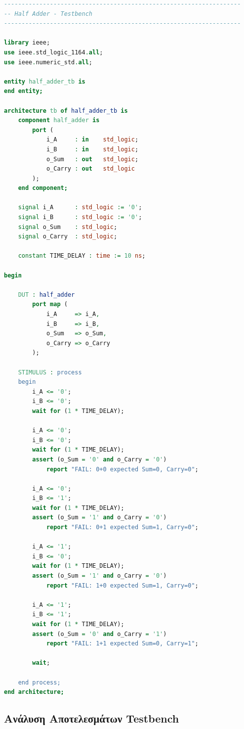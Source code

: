 \documentclass[12pt]{article}
\begin{document}
\begin{lstlisting}[language=VHDL]
-------------------------------------------------------------------
-- Half Adder - Testbench
-------------------------------------------------------------------

library ieee;
use ieee.std_logic_1164.all;
use ieee.numeric_std.all;

entity half_adder_tb is
end entity;

architecture tb of half_adder_tb is
    component half_adder is
        port (
            i_A     : in    std_logic;
            i_B     : in    std_logic;
            o_Sum   : out   std_logic;
            o_Carry : out   std_logic
        );
    end component;

    signal i_A      : std_logic := '0';
    signal i_B      : std_logic := '0';
    signal o_Sum    : std_logic;
    signal o_Carry  : std_logic;

    constant TIME_DELAY : time := 10 ns;

begin

    DUT : half_adder
        port map (
            i_A     => i_A,
            i_B     => i_B,
            o_Sum   => o_Sum,
            o_Carry => o_Carry
        );

    STIMULUS : process
    begin
        i_A <= '0';
        i_B <= '0';
        wait for (1 * TIME_DELAY);

        i_A <= '0';
        i_B <= '0';
        wait for (1 * TIME_DELAY);
        assert (o_Sum = '0' and o_Carry = '0')
            report "FAIL: 0+0 expected Sum=0, Carry=0";

        i_A <= '0';
        i_B <= '1';
        wait for (1 * TIME_DELAY);
        assert (o_Sum = '1' and o_Carry = '0')
            report "FAIL: 0+1 expected Sum=1, Carry=0";

        i_A <= '1';
        i_B <= '0';
        wait for (1 * TIME_DELAY);
        assert (o_Sum = '1' and o_Carry = '0')
            report "FAIL: 1+0 expected Sum=1, Carry=0";

        i_A <= '1';
        i_B <= '1';
        wait for (1 * TIME_DELAY);
        assert (o_Sum = '0' and o_Carry = '1')
            report "FAIL: 1+1 expected Sum=0, Carry=1";

        wait;

    end process;
end architecture;
\end{lstlisting}

\subsection*{Ανάλυση Αποτελεσμάτων Testbench}
\end{document}
